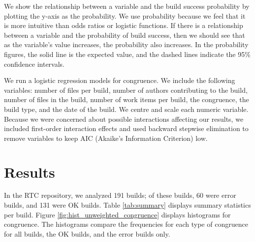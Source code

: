 We show the relationship between a variable and the build success probability by plotting the y-axis as the probability. We use probability because we feel that it is more intuitive than odds ratios or logistic functions. If there is a relationship between a variable and the probability of build success, then we should see that as the variable's value increases, the probability also increases. In the probability figures, the solid line is the expected value, and the dashed lines indicate the 95\% confidence intervals.

We run a logistic regression models for congruence. We include the following variables: number of files per build, number of authors contributing to the build, number of files in the build, number of work items per build, the congruence, the build type, and the date of the build. We centre and scale each numeric variable.
Because we were concerned about possible interactions affecting our results, we included first-order interaction effects and used backward stepwise elimination to remove variables to keep AIC (Akaike's Information Criterion) low.

\section{Results}
\label{sec:results}
In the RTC repository, we analyzed 191 builds; of these builds, 60 were error builds, and 131 were OK builds. Table \ref{tab:summary} displays summary statistics per build.
Figure \ref{fig:hist_unweighted_congruence} displays histograms for congruence. The histograms compare the frequencies for each type of congruence for all builds, the OK builds, and the error builds only.

